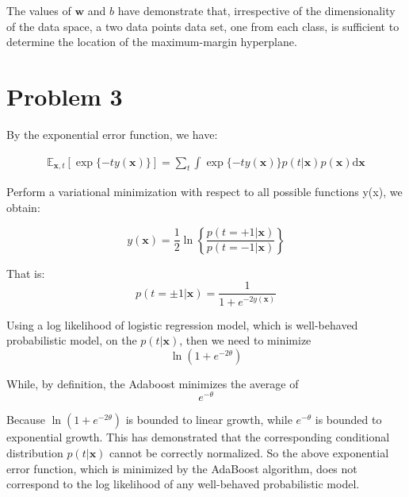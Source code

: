 \documentclass[twoside,11pt]{homework}
\newcommand{\vect}[1]{\boldsymbol{\mathbf{#1}}}
\begin{document}
The values of $\vect{w}$ and $b$ have demonstrate that, irrespective of the dimensionality of the data space, a two data points data set, one from each class, is sufficient to determine the location of the maximum-margin hyperplane.


\section*{Problem 3}
By the exponential error function, we have:

\begin{align*}
\mathbb{E}_{\vect{x},t} [\exp\{-ty(\vect{x})\}] = \sum_t \int \exp\{ -ty(\vect{x})\}p(t | \vect{x})p(\vect{x}) \mathrm{d}\vect{x}
\end{align*}

Perform a variational minimization with respect to all possible functions y(x), we obtain:

$$
y(\vect{x}) = \frac{1}{2} \ln \left\{ \frac{p(t=+1| \vect{x} )}{p(t=-1| \vect{x} )} \right\} 
$$

That is:
$$
p(t=\pm 1| \vect{x}) = \frac{1}{1+ e^{-2y(\vect{x})}}
$$

Using a log likelihood of logistic regression model, which is well-behaved probabilistic model, on the $p(t| \vect{x})$, then we need to minimize $$\ln (1+e^{-2\theta})$$
 
While, by definition, the Adaboost minimizes the average of $$e^{-\theta}$$

Because $\ln (1+e^{-2\theta})$ is bounded to linear growth, while $e^{-\theta}$ is bounded to exponential growth. This has demonstrated that the corresponding conditional distribution $p(t| \vect{x})$ cannot be correctly normalized. So the above exponential error function, which is minimized by the AdaBoost algorithm, does not correspond to the log likelihood of any well-behaved probabilistic model.
\end{document}
